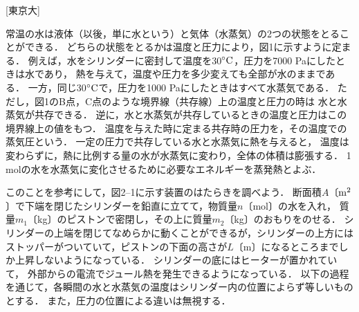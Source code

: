 



\noindent{} [東京大]

常温の水は液体（以後，単に水という）と気体（水蒸気）の2つの状態をとることができる．
どちらの状態をとるかは温度と圧力により，図1に示すように定まる．
例えば，水をシリンダーに密封して温度を30${}^\circ\mathrm{C}$，圧力を7000 Paにしたときは水であり，
熱を与えて，温度や圧力を多少変えても全部が水のままである．
一方，同じ30${}^\circ\mathrm{C}$で，圧力を1000 Paにしたときはすべて水蒸気である．
ただし，図1のB点，C点のような境界線（共存線）上の温度と圧力の時は
水と水蒸気が共存できる．
逆に，水と水蒸気が共存しているときの温度と圧力はこの境界線上の値をもつ．
温度を与えた時に定まる共存時の圧力を，その温度での蒸気圧という．
一定の圧力で共存している水と水蒸気に熱を与えると，
温度は変わらずに，熱に比例する量の水が水蒸気に変わり，全体の体積は膨張する．
1 molの水を水蒸気に変化させるために必要なエネルギーを蒸発熱とよぶ．

このことを参考にして，図2--1に示す装置のはたらきを調べよう．
断面積$A$〔$\mathrm{m^2}$〕で下端を閉じたシリンダーを鉛直に立てて，物質量$n$〔mol〕の水を入れ，
質量$m_1$〔kg〕のピストンで密閉し，その上に質量$m_2$〔kg〕のおもりをのせる．
シリンダーの上端を閉じてなめらかに動くことができるが，シリンダーの上方にはストッパーがついていて，ピストンの下面の高さが$L$〔m〕になるところまでしか上昇しないようになっている．
シリンダーの底にはヒーターが置かれていて，
外部からの電流でジュール熱を発生できるようになっている．
以下の過程を通じて，各瞬間の水と水蒸気の温度はシリンダー内の位置によらず等しいものとする．
また，圧力の位置による違いは無視する．


